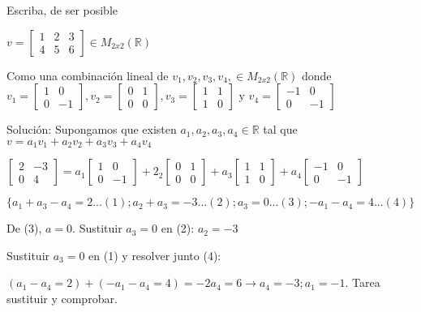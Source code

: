 \begin{ejem}

 Escriba, de ser posible

$v = [\begin{matrix}
    1 & 2 & 3 \\ 4 & 5 & 6
\end{matrix} ] \in M_{2x2}(\mathbb{R}) $

Como una combinaci\'{o}n lineal de $v_1,v_2,v_3,v_4,\in M_{2x2}(\mathbb{R})$ donde $v_1 = [\begin{matrix}
    1 & 0  \\ 0 & -1
\end{matrix} ] , v_2 = [\begin{matrix}
    0 & 1  \\ 0 & 0
\end{matrix} ], v_3 = [\begin{matrix}
    1 & 1  \\ 1 & 0
\end{matrix} ] \text{ y } v_4 = [\begin{matrix}
    -1 & 0  \\ 0 & -1
\end{matrix} ] $


Soluci\'{o}n: Supongamos que existen $a_1,a_2,a_3,a_4\in\mathbb{R}$ tal que $v =a_1v_1+a_2v_2+a_3v_3+a_4v_4$


$    [\begin{matrix}
    2 & -3  \\  0& 4
\end{matrix} ]  = a_1[\begin{matrix}
    1 & 0  \\ 0 & -1
\end{matrix} ] + 2_2 [\begin{matrix}
    0 & 1  \\ 0 & 0
\end{matrix} ]+ a_3[\begin{matrix}
    1 & 1  \\ 1 & 0
\end{matrix} ] +  a_4[\begin{matrix}
    -1 & 0  \\ 0 & -1
\end{matrix} ] $


$\{a_1 + a_3 -a_4 = 2...(1);a_2+a_3 =-3...(2); a_3 = 0...(3); -a_1 -a_4 = 4...(4)  \} $

De (3), $a=0$. Sustituir $a_3 = 0 $ en (2): $a_2=-3$

Sustituir $a_3 = 0$ en (1) y resolver junto (4):

$(a_1 -a_4=2)+ (-a_1 -a_4=4)=-2a_4=6 \to a_4=-3; a_1=-1.  $ Tarea sustituir y comprobar.

\end{ejem}

